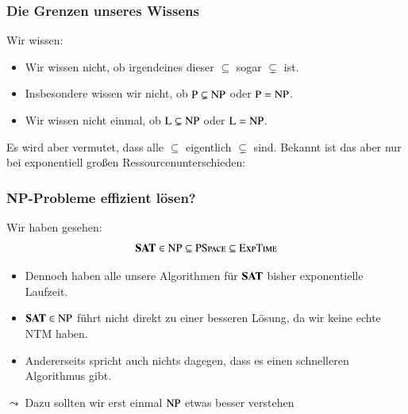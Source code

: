 \documentclass[onlymath]{beamer}
\begin{document}
\begin{frame}\frametitle{Die Grenzen unseres Wissens}

Wir wissen:

\theobox{
\[\Scomplclass{L}\subseteq\Scomplclass{NL}\subseteq \Scomplclass{P}\subseteq\Scomplclass{NP}\subseteq\Scomplclass{PSpace}= \Scomplclass{NPSpace}\subseteq \Scomplclass{Exp}\subseteq \Scomplclass{NExp}\]
\vspace{-2.5ex}
}

\begin{itemize}
\item Wir wissen nicht, ob irgendeines dieser $\subseteq$ sogar $\subsetneq$ ist.
\item Insbesondere wissen wir nicht, ob ${\textsc{P}}\subsetneq{\textsc{NP}}$ oder ${\textsc{P}}={\textsc{NP}}$.
\item Wir wissen nicht einmal, ob ${\textsc{L}}\subsetneq{\textsc{NP}}$ oder ${\textsc{L}}={\textsc{NP}}$.
\end{itemize}\pause
Es wird aber vermutet, dass alle  $\subseteq$ eigentlich $\subsetneq$ sind.
% 
Bekannt ist das aber nur bei exponentiell großen Ressourcenunterschieden:


\end{frame}



\begin{frame}\frametitle{NP-Probleme effizient lösen?}

Wir haben gesehen:
\[ \textbf{\textcolor{black}{SAT}}\in{\textsc{NP}}\subseteq{\textsc{PSpace}}\subseteq{\textsc{ExpTime}}\]

\begin{itemize}
\item Dennoch haben alle unsere Algorithmen für $\textbf{\textcolor{black}{SAT}}$ bisher 
exponentielle Laufzeit.
\item $\textbf{\textcolor{black}{SAT}}\in{\textsc{NP}}$ führt nicht direkt zu einer besseren Lösung, da wir keine echte NTM haben.
\item Andererseits spricht auch nichts dagegen, dass es einen schnelleren Algorithmus gibt.
\end{itemize}

$\leadsto$ Dazu sollten wir erst einmal ${\textsc{NP}}$ etwas besser verstehen

\end{frame}
\end{document}
